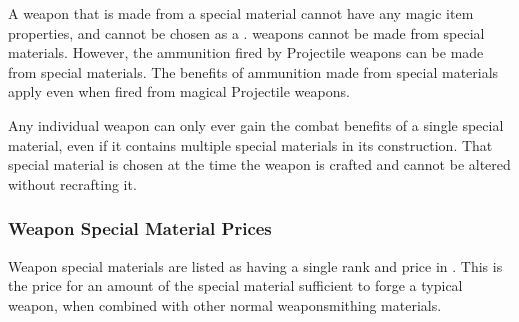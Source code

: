     A weapon that is made from a special material cannot have any magic item properties, and cannot be chosen as a .
     weapons cannot be made from special materials.
    However, the ammunition fired by Projectile weapons can be made from special materials.
    The benefits of ammunition made from special materials apply even when fired from magical Projectile weapons.

    Any individual weapon can only ever gain the combat benefits of a single special material, even if it contains multiple special materials in its construction.
    That special material is chosen at the time the weapon is crafted and cannot be altered without recrafting it.

    \subsubsection{Weapon Special Material Prices}
      Weapon special materials are listed as having a single rank and price in .
      This is the price for an amount of the special material sufficient to forge a typical weapon, when combined with other normal weaponsmithing materials.

